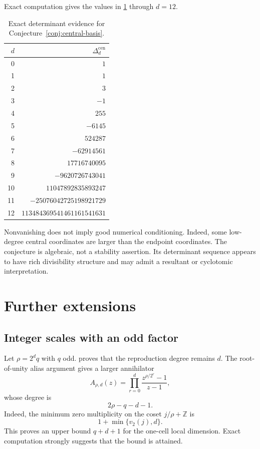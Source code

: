 \documentclass[11pt,oneside]{article}
\theoremstyle{definition}
\theoremstyle{remark}
\newcommand{\Z}{\mathbb Z}
\newcommand{\vtwo}{v_2}
\begin{document}
Exact computation gives the values in \cref{tab:central-det} through $d=12$.
\begin{table}[htbp]
\centering
\caption{Exact determinant evidence for Conjecture~\ref{conj:central-basis}.}
\label{tab:central-det}
\small
\begin{tabular}{r r}
\toprule
$d$ & $\Delta_d^{\mathrm{cen}}$\\
\midrule
0 & $1$\\
1 & $1$\\
2 & $3$\\
3 & $-1$\\
4 & $255$\\
5 & $-6145$\\
6 & $524287$\\
7 & $-62914561$\\
8 & $17716740095$\\
9 & $-9620726743041$\\
10 & $11047892835893247$\\
11 & $-25076042725198921729$\\
12 & $113484369541461161541631$\\
\bottomrule
\end{tabular}
\end{table}

Nonvanishing does not imply good numerical conditioning.  Indeed, some low-degree central coordinates are larger than the endpoint coordinates.  The conjecture is algebraic, not a stability assertion.  Its determinant sequence appears to have rich divisibility structure and may admit a resultant or cyclotomic interpretation.

\section{Further extensions}
\label{sec:extensions}

\subsection{Integer scales with an odd factor}
Let $\rho=2^dq$ with $q$ odd.   proves that the reproduction degree remains $d$.  The root-of-unity alias argument gives a larger annihilator
\begin{equation}
 A_{\rho,d}(z)=
 \prod_{r=0}^{d}\frac{z^{\rho/2^r}-1}{z-1},              \label{eq:general-M-A}
\end{equation}
whose degree is
\begin{equation}
 2\rho-q-d-1.                                             \label{eq:general-M-degree}
\end{equation}
Indeed, the minimum zero multiplicity on the coset $j/\rho+\Z$ is
\begin{equation}
 1+\min\{\vtwo(j),d\}.                                   \label{eq:general-M-mu}
\end{equation}
This proves an upper bound $q+d+1$ for the one-cell local dimension.  Exact computation strongly suggests that the bound is attained.
\end{document}
